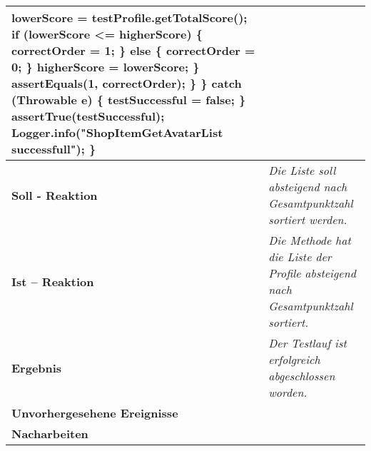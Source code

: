\begin{longtable}{|p{4cm}|p{11cm}|}
{\hspace*{12mm}                lowerScore = testProfile.getTotalScore(); \newline
\hspace*{12mm}                if (lowerScore <= higherScore) \{ \newline
\hspace*{15mm}                    correctOrder = 1; \newline
\hspace*{12mm}                \} else \{ \newline
\hspace*{15mm}                    correctOrder = 0; \newline
\hspace*{12mm}                \} \newline
\hspace*{12mm}                higherScore = lowerScore; \newline
\hspace*{9mm}            \} \newline
\hspace*{9mm}            assertEquals(1, correctOrder); \newline
\hspace*{6mm}        \} \newline
\hspace*{3mm}    \} catch (Throwable e) \{ \newline
\hspace*{6mm}        testSuccessful = false; \newline
\hspace*{3mm}    \} \newline
\hspace*{3mm}    assertTrue(testSuccessful); \newline
\hspace*{3mm}    Logger.info("ShopItemGetAvatarList successfull"); \newline
\} \newline
} \\
\hline
\textbf{Soll - Reaktion} & \textit{Die Liste soll absteigend nach Gesamtpunktzahl sortiert werden.} \\
\hline
\textbf{Ist -- Reaktion} & \textit{Die Methode hat die Liste der Profile absteigend nach Gesamtpunktzahl sortiert.} \\
\hline
\textbf{Ergebnis} & \textit{Der Testlauf ist erfolgreich abgeschlossen worden.} \\
\hline
\textbf{Unvorhergesehene Ereignisse} &
\textit{} \\
\hline
\textbf{Nacharbeiten } & \textit{} \\
\hline
\end{longtable}

